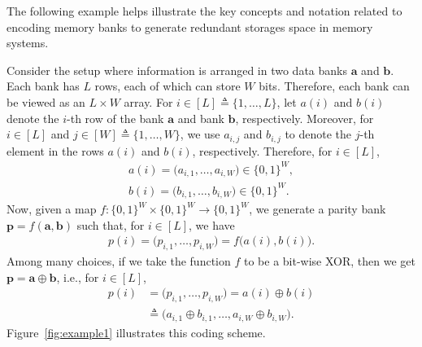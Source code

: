 The following example helps illustrate the key concepts and notation related to encoding memory banks to generate redundant storages space in memory systems. 

 \begin{example}
Consider the setup where information is arranged in two data banks $\mathbf{a}$ and $\mathbf{b}$. Each bank has $L$ rows, each of which can store $W$ bits. Therefore, each bank can be viewed as an $L \times W$ array. For $i \in [L] \triangleq \{1,\ldots, L\}$, let $a(i)$ and $b(i)$ denote the $i$-th row of the bank $\mathbf{a}$ and bank $\mathbf{b}$, respectively. Moreover, for $i \in [L]$ and $j \in [W] \triangleq \{1,\ldots, W\}$, we use $a_{i, j}$ and $b_{i, j}$ to denote the $j$-th element in the rows $a(i)$ and $b(i)$, respectively. Therefore, for $i \in [L]$,
\begin{align}
a(i) = \big(a_{i,1}, \ldots, a_{i, W}\big) \in \{0, 1\}^W,\nonumber \\
b(i) = \big(b_{i,1}, \ldots, b_{i, W}\big) \in \{0, 1\}^W. \nonumber
\end{align}
Now, given a map $f: \{0, 1\}^W \times \{0, 1\}^W \to \{0, 1\}^W$, we generate a parity bank $\mathbf{p} = f(\mathbf{a}, \mathbf{b})$ such that, for $i \in [L]$, we have
\begin{align}
p(i) = \big(p_{i, 1},\ldots, p_{i,W}\big) = f\big(a(i), b(i)\big).
\end{align}
Among many choices, if we take the function $f$ to be a bit-wise XOR, then we get $\mathbf{p} = \mathbf{a} \oplus \mathbf{b}$, i.e., for $i \in [L]$, 
\begin{align}
p(i) &= \big(p_{i, 1},\ldots, p_{i,W}\big) = a(i) \oplus b(i)\nonumber \\
&\triangleq \big(a_{i,1}\oplus b_{i,1},\ldots, a_{i,W}\oplus b_{i,W}\big). 
\end{align}
Figure~\ref{fig:example1} illustrates this coding scheme. 
\end{example}

